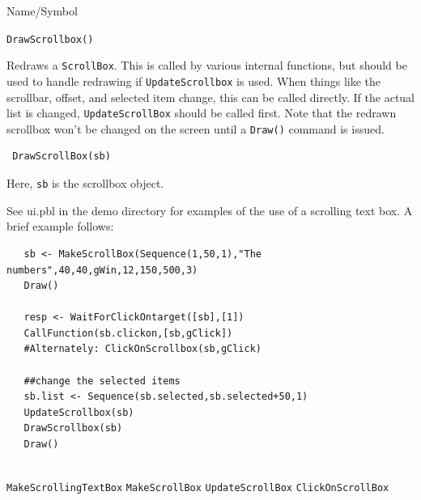 \begin{desc}{Name/Symbol}
\item[Name/Symbol]  	\verb+DrawScrollbox()+

\item[Description]	
Redraws a \verb+ScrollBox+.  This is called by various internal functions, but should be used to handle redrawing if \texttt{UpdateScrollbox} is used. When things like the scrollbar, offset, and selected item change, this can be called directly.  If the actual list is changed, \texttt{UpdateScrollBox} should be called first. Note that the redrawn scrollbox won't be changed on the screen until a \verb+Draw()+ command is issued.

\item[Usage]
\begin{verbatim}
 DrawScrollBox(sb)
  \end{verbatim}

Here, \texttt{sb} is the scrollbox object.

\item[Example]      	
See ui.pbl in the demo directory for examples of the use of a scrolling text box.  A brief example follows:

\begin{verbatim}
   sb <- MakeScrollBox(Sequence(1,50,1),"The numbers",40,40,gWin,12,150,500,3)
   Draw()
	  
   resp <- WaitForClickOntarget([sb],[1])
   CallFunction(sb.clickon,[sb,gClick])
   #Alternately: ClickOnScrollbox(sb,gClick) 
 
   ##change the selected items
   sb.list <- Sequence(sb.selected,sb.selected+50,1)
   UpdateScrollbox(sb)      
   DrawScrollbox(sb)
   Draw()
 
\end{verbatim}

\item[See Also]
\verb+MakeScrollingTextBox+
\verb+MakeScrollBox+
\verb+UpdateScrollBox+
\verb+ClickOnScrollBox+
\end{desc}


\vfill
\newpage
{}
\vfill

